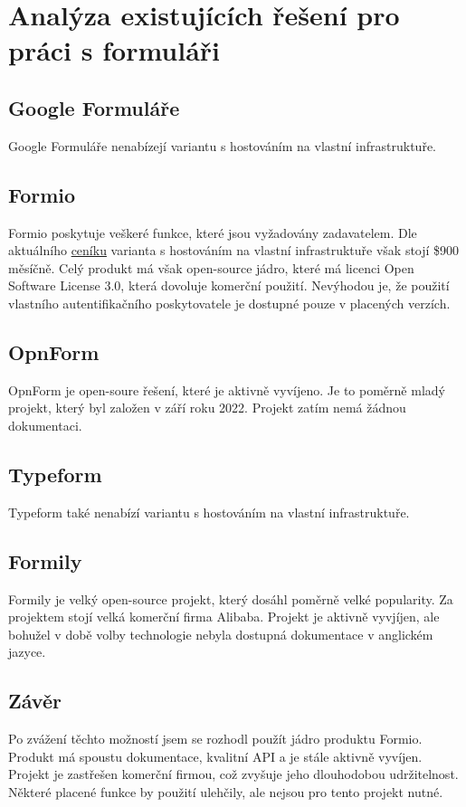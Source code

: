 
\chapter{Analýza existujících řešení pro práci s formuláři}

\section{Google Formuláře}

Google Formuláře nenabízejí variantu s hostováním na vlastní infrastruktuře.

\section{Formio}

Formio poskytuje veškeré funkce, které jsou vyžadovány zadavatelem.
Dle aktuálního \href{https://form.io/pricing}{ceníku} varianta s hostováním na vlastní infrastruktuře však stojí \$900 měsíčně.
Celý produkt má však open-source jádro, které má licenci Open Software License 3.0, která dovoluje komerční použití.
Nevýhodou je, že použití vlastního autentifikačního poskytovatele je dostupné pouze v placených verzích.

\section{OpnForm}

OpnForm je open-soure řešení, které je aktivně vyvíjeno.
Je to poměrně mladý projekt, který byl založen v září roku 2022.
Projekt zatím nemá žádnou dokumentaci.

\section{Typeform}

Typeform také nenabízí variantu s hostováním na vlastní infrastruktuře.

\section{Formily}

Formily je velký open-source projekt, který dosáhl poměrně velké popularity.
Za projektem stojí velká komerční firma Alibaba. 
Projekt je aktivně vyvjíjen, ale bohužel v době volby technologie nebyla dostupná dokumentace v anglickém jazyce.

\section{Závěr}

Po zvážení těchto možností jsem se rozhodl použít jádro produktu Formio.
Produkt má spoustu dokumentace, kvalitní API a je stále aktivně vyvíjen.
Projekt je zastřešen komerční firmou, což zvyšuje jeho dlouhodobou udržitelnost.
Některé placené funkce by použití ulehčily, ale nejsou pro tento projekt nutné.
